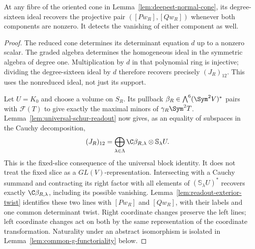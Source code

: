 \begin{lemma}
\label{lem:plucker-component-readout}
At any fibre of the oriented cone in
Lemma~\ref{lem:deepest-normal-cone}, its degree-sixteen ideal
recovers the projective pair \(([Pw_R],[Qw_R])\) whenever both
components are nonzero.  It detects the vanishing of either component
as well.
\end{lemma}
\begin{proof}
The reduced cone determines its determinant equation \(d\) up to a
nonzero scalar.  The graded algebra determines the homogeneous ideal
in the symmetric algebra of degree one.  Multiplication by \(d\)
in that polynomial ring is injective; dividing the degree-sixteen
ideal by \(d\) therefore recovers precisely \((J_R)_{12}\).
This uses the nonreduced ideal, not just its support.

Let \(U=K_0\) and choose a volume on \(S_R\).  Its pullback
\(\beta_R\in\bigwedge^6(\Sym^2V)^*\) pairs with
\(\mathcal F(T)\) to give exactly the maximal minors of
\(\gamma_R\Sym^2T\).  Lemma~\ref{lem:universal-schur-readout}
now gives, as an equality of subspaces in the Cauchy decomposition,
\begin{equation}\label{eq:minor-coefficient-readout}
 (J_R)_{12}=\bigoplus_{\lambda\in\Lambda}
       \C\beta_{R,\lambda}\otimes\mathbb S_\lambda U.
\end{equation}
This is the fixed-slice consequence of the universal block identity.
It does not treat the fixed slice as a \(GL(V)\)-representation.
Intersecting with a Cauchy summand and contracting its right factor
with all elements of \((\mathbb S_\lambda U)^*\) recovers exactly
\(\C\beta_{R,\lambda}\), including its possible vanishing.
Lemma~\ref{lem:readout-exterior-twist} identifies these two lines with
\([Pw_R]\) and \([Qw_R]\), with their labels and one common
determinant twist.  Right coordinate changes preserve the left lines;
left coordinate changes act on both by the same representation of the
coordinate transformation.  Naturality under an abstract isomorphism
is isolated in Lemma~\ref{lem:common-g-functoriality} below.
\end{proof}







